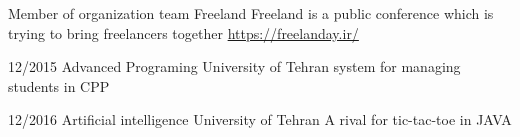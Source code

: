 \documentclass[9pt]{developercv}
\begin{document}
\begin{entrylist}
	\entry
	{}
	{Member of organization team}
	{Freeland}
	{Freeland is a public conference which is trying to bring freelancers together
			{{\href{https://freelanday.ir/}{https://freelanday.ir/}}}
	}
\end{entrylist}




\begin{entrylist}
	\entry
	{12/2015}
	{Advanced Programing}
	{University of Tehran}
	{system for managing students in CPP}
\end{entrylist}
\begin{entrylist}
	\entry
	{12/2016}
	{Artificial intelligence}
	{University of Tehran}
	{A rival for tic-tac-toe in JAVA}
\end{entrylist}
\end{document}
